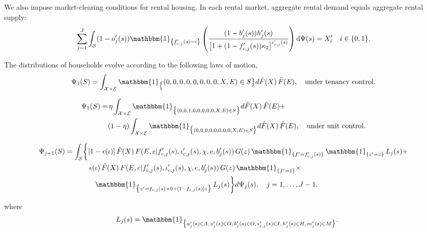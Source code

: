 \documentclass[parskip=full]{article}
\begin{document}
We also impose market-clearing conditions for rental housing. In each rental market, aggregate rental demand equals aggregate rental supply:
\begin{equation}\label{eq:rental_housing_clearing_condition}
  \sum_{j=1}^J \int_\mathcal{S} (1-o'_{j}(s))\mathbbm{1}_{\left\{f'_{c,j}(s)=i\right\}}\left(\frac{(1-b'_{j}(s))h'_{j}(s)}{\left[1+(1-f'_{c,j}(s))\kappa_{2}\right]^{\iota'_{c,j}(s)}}\right) \mathrm{d}\Psi(s) = X'_{i} \quad i \in \{0,1\}.
\end{equation}

The distributions of households evolve according to the following laws of motion,
\begin{equation}\label{eq:lom1}
\Psi_{1}(S) = \int_{\mathcal{X} \times \mathcal{E}} \mathbbm{1}_\big\{ (0,0,0,0,0,0,0,0,X,E) \in S \big\} d\hat{F}(X)\, \tilde{F}(E), \quad \text{under tenancy control.}
\end{equation}

\begin{equation}\label{eq:lom1_2}
\begin{split}
\Psi_{1}(S) = & \, \eta \int_{\mathcal{X} \times \mathcal{E}} \mathbbm{1}_{\big\{ (0,0,1,0,0,0,0,0,X,E) \in S \big\}} d\hat{F}(X)\, \tilde{F}(E)+ \\ & (1-\eta) \int_{\mathcal{X} \times \mathcal{E}} \mathbbm{1}_{\big\{ (0,0,0,0,0,0,0,0,X,E) \in S \big\}} d\hat{F}(X)\, \tilde{F}(E), \quad \text{under unit control.}
\end{split}
\end{equation}

\begin{equation}\label{eq:lom2}
\begin{split}
\Psi_{j+1}(S) = \int_{\mathcal{S}} \biggl\{ 
& [1-\epsilon(\iota)]\, \hat{F}(X)\, F(E,e | f'_{c,j}(s), \iota'_{c,j}(s), \chi, e, b'_j(s))\, G(z)\, \mathbbm{1}_{\{ f' = f'_{c,j}(s) \}}\, \mathbbm{1}_{\{ z' = z \}}\, L_j(s)+ \\ & \, \epsilon(\iota)\, \hat{F}(X)\, F(E,e | f'_{c,j}(s), \iota'_{c,j}(s), \chi, e, b'_j(s))\, G(z)\, \mathbbm{1}_{\{ f' = 1 \}} \times \\ & \quad  \mathbbm{1}_{\big\{ z' = f_{c,j}(s) \times 0 + [1 - f_{c,j}(s)] z \big\}}\, L_j(s)
\biggr\} d\Psi_j(s), \quad j=1,\ldots,J-1,
\end{split}
\end{equation}

\noindent where
\[ \quad L_j(s) = \mathbbm{1}_{\big\{ a'_j(s) \in A,\, o'_j(s) \in O,\, b'_j(s) \in O,\, \iota'_{c,j}(s) \in I,\, h'_j(s) \in H,\, m'_j(s) \in M \big\}}.\]
\end{document}
